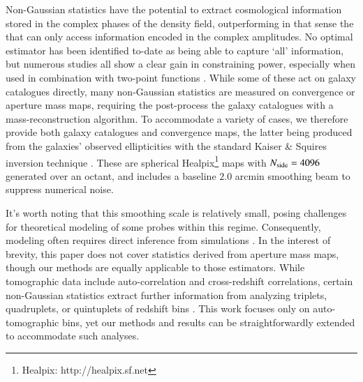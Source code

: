 Non-Gaussian statistics have the potential to extract cosmological information stored in the complex phases of the density field, outperforming in that sense the \gtwopcf that can only access information encoded in the complex amplitudes.
No optimal estimator has been identified to-date as being able to capture `all' information, but numerous studies all show a clear gain in constraining power, especially when used in combination with two-point functions \citep{HD21, DESY3_Zuercher, HSC_PeaksSims}.
While some of these act on galaxy catalogues directly, many non-Gaussian statistics are measured on convergence or aperture mass maps, requiring the post-process the galaxy catalogues with a mass-reconstruction algorithm.
To accommodate a variety of cases, we therefore provide both galaxy catalogues and convergence maps, the latter being  produced from the galaxies' observed ellipticities with the standard Kaiser \& Squires inversion technique \citep{KaiserSquires}.
These are spherical {\sc Healpix}\footnote{{\sc Healpix}: http://healpix.sf.net}  maps \citep{healpix} with $N_{\rm side}=4096$ generated over an octant, and includes a baseline $2.0$ arcmin smoothing beam to suppress numerical noise.

It's worth noting that this smoothing scale is relatively small, posing challenges for theoretical modeling of some probes within this regime.
Consequently, modeling often requires direct inference from simulations \citep[see][]{HD21, DESY3_Zuercher, HSCY1_Peaks_sims}.
In the interest of brevity, this paper does not cover statistics derived from aperture mass maps, though our methods are equally applicable to those estimators.
While tomographic \gtwopcf data include auto-correlation and cross-redshift correlations, certain non-Gaussian statistics extract further information from analyzing triplets, quadruplets, or quintuplets of redshift bins \citep{Martinet21a}.
This work focuses only on auto-tomographic bins, yet our methods and results can be straightforwardly extended to accommodate such analyses.

 
